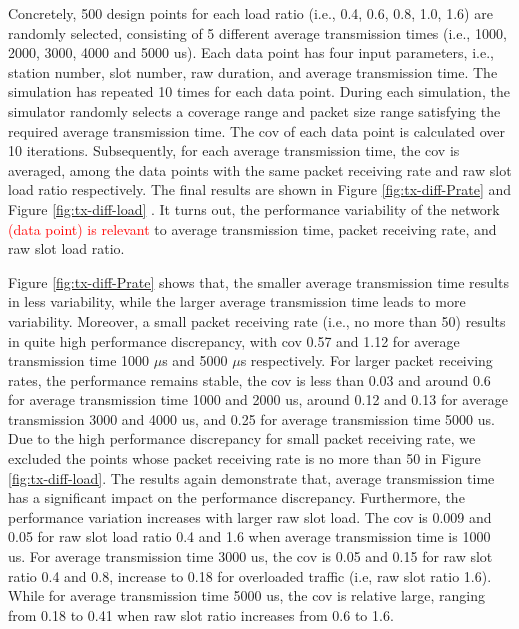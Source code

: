 Concretely, 500 design points for each load ratio (i.e., 0.4, 0.6, 0.8, 1.0, 1.6) are randomly selected, consisting of 5 different average transmission times (i.e., 1000,
2000, 3000, 4000 and 5000 us). Each data point has four input parameters, i.e., station number, slot number, \gls{raw} duration, and average transmission time. The simulation has repeated 10 times for each data point. During each simulation, the simulator randomly selects a coverage range and packet size range satisfying the required average transmission time. The \gls{cov} of each data point is calculated over 10 iterations. Subsequently, for each average transmission time, the \gls{cov} is averaged, among the data points with the same packet receiving rate and \gls{raw} slot load ratio respectively. The final results are shown in Figure \ref{fig:tx-diff-Prate} and Figure \ref{fig:tx-diff-load} . It turns out, the performance variability of the network \textcolor{red}{ (data point) is relevant} to  average transmission time, packet receiving rate, and \gls{raw} slot load ratio.



Figure \ref{fig:tx-diff-Prate} shows that, the smaller average transmission time results in less variability, while the larger average transmission time leads to more variability. Moreover, a small packet receiving rate (i.e., no more than 50) results in quite high performance discrepancy, with \gls{cov} 0.57 and 1.12 for average transmission time 1000 $\mu$s and 5000 $\mu$s respectively. For  larger packet receiving rates, the performance remains stable, the \gls{cov} is less than 0.03 and around 0.6 for average transmission time 1000 and 2000 us, around 0.12 and 0.13 for average transmission 3000 and 4000 us, and 0.25 for average transmission time 5000 us. Due to the high performance discrepancy for small packet receiving rate, we excluded the points whose packet receiving rate is no more than 50 in Figure \ref{fig:tx-diff-load}.
The results again demonstrate that, average transmission time has a significant impact on the performance discrepancy. Furthermore, the performance variation increases with larger \gls{raw} slot load. The \gls{cov} is 0.009 and 0.05 for \gls{raw} slot load ratio 0.4 and 1.6 when average transmission time is 1000 us. For average transmission time 3000 us, the \gls{cov} is 0.05 and 0.15 for \gls{raw} slot ratio 0.4 and 0.8, increase to 0.18 for overloaded traffic (i.e, \gls{raw} slot ratio 1.6).  While for average transmission time 5000 us, the \gls{cov} is relative large, ranging from 0.18 to 0.41 when \gls{raw} slot ratio increases from 0.6 to 1.6.



